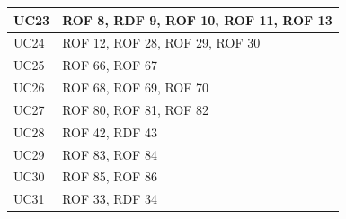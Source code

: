 \documentclass[12pt, oneside]{article}
\begin{document}
\begin{longtable}{|p{4cm}|p{12cm}|}
    \hline
    UC23 & ROF 8, RDF 9, ROF 10, ROF 11, ROF 13 \\
    \hline
    UC24 & ROF 12, ROF 28, ROF 29, ROF 30\\
    \hline
    UC25 & ROF 66, ROF 67 \\
    \hline
    UC26 & ROF 68, ROF 69, ROF 70 \\
    \hline
    UC27 & ROF 80, ROF 81, ROF 82 \\
    \hline
    UC28 & ROF 42, RDF 43 \\
    \hline
    UC29 & ROF 83, ROF 84 \\
    \hline
    UC30 & ROF 85, ROF 86 \\
    \hline
    UC31 & ROF 33, RDF 34 \\
    \hline

    
    
\end{longtable}
\end{document}
